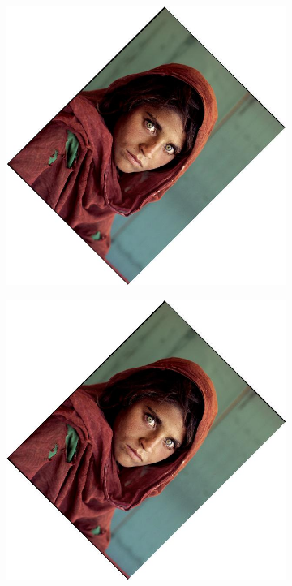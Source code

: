 \documentclass{article}
\begin{document}
\begin{figure}[H]
    \centering
    \begin{subfigure}{.3\textwidth}
        \centering
        \includegraphics[scale=0.04]{q1/output/similar_0.5_0.5_2.jpg}
    \end{subfigure}
    \begin{subfigure}{.3\textwidth}
        \centering
        \includegraphics[scale=0.04]{q1/output/similar_0.5_1_2.jpg}

\end{subfigure}
\end{figure}
\end{document}

